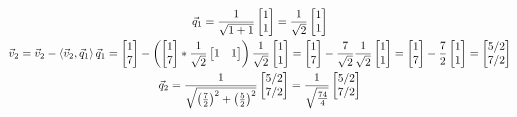 \documentclass[10pt,letterpaper]{article}
\begin{document}
\begin{enumerate}[i)]
\color{violet}
\begin{gather*}
\vec{q}_{1} = \frac{1}{\sqrt{1 + 1}}\begin{bmatrix}
1 \\
1
\end{bmatrix} = \frac{1}{\sqrt{2}}\begin{bmatrix}
1 \\
1
\end{bmatrix} \\
\vec{v}_{2} = \vec{v}_{2} - \braket{\vec{v}_{2}, \vec{q}_{1}}\vec{q}_{1} = \begin{bmatrix}
1 \\
7
\end{bmatrix} - \left( \begin{bmatrix}
1 \\
7
\end{bmatrix} * \frac{1}{\sqrt{2}}\begin{bmatrix}
1 & 1
\end{bmatrix} \right)\frac{1}{\sqrt{2}}\begin{bmatrix}
1 \\
1
\end{bmatrix} = \begin{bmatrix}
1 \\
7
\end{bmatrix} - \frac{7}{\sqrt{2}}\frac{1}{\sqrt{2}}\begin{bmatrix}
1 \\
1
\end{bmatrix} = \begin{bmatrix}
1 \\
7
\end{bmatrix} - \frac{7}{2}\begin{bmatrix}
1 \\
1
\end{bmatrix} = \begin{bmatrix}
5/2 \\
7/2
\end{bmatrix} \\
\vec{q}_{2} = \frac{1}{\sqrt{\left( \frac{7}{2} \right)^{2} + \left( \frac{5}{2} \right)^{2}}}\begin{bmatrix}
5/2 \\
7/2
\end{bmatrix} = \frac{1}{\sqrt{\frac{74}{4}}}\begin{bmatrix}
5/2 \\
7/2
\end{bmatrix}
\end{gather*}
\color{black}

\end{enumerate}
\end{document}
